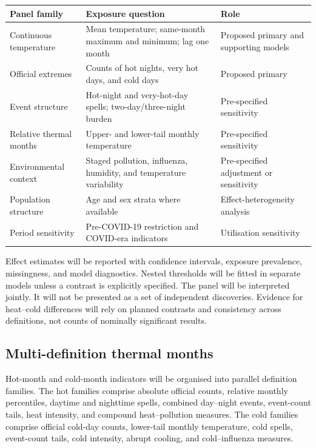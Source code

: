 \documentclass[11pt,a4paper]{article}
\begin{document}
\begin{table}[htbp]
\centering
\small
\begin{tabularx}{\textwidth}{@{}>{\raggedright\arraybackslash}p{}
                                  >{\raggedright\arraybackslash}X
                                  >{\raggedright\arraybackslash}p{}@{}}
\toprule
Panel family & Exposure question & Role \\
\midrule
Continuous temperature & Mean temperature; same-month maximum and minimum; lag one month & Proposed primary and supporting models \\
Official extremes & Counts of hot nights, very hot days, and cold days & Proposed primary \\
Event structure & Hot-night and very-hot-day spells; two-day/three-night burden & Pre-specified sensitivity \\
Relative thermal months & Upper- and lower-tail monthly temperature & Pre-specified sensitivity \\
Environmental context & Staged pollution, influenza, humidity, and temperature variability & Pre-specified adjustment or sensitivity \\
Population structure & Age and sex strata where available & Effect-heterogeneity analysis \\
Period sensitivity & Pre-COVID-19 restriction and COVID-era indicators & Utilisation sensitivity \\
\bottomrule
\end{tabularx}
\end{table}

Effect estimates will be reported with confidence intervals, exposure prevalence, missingness, and model diagnostics. Nested thresholds will be fitted in separate models unless a contrast is explicitly specified. The panel will be interpreted jointly. It will not be presented as a set of independent discoveries. Evidence for heat--cold differences will rely on planned contrasts and consistency across definitions, not counts of nominally significant results.

\subsection{Multi-definition thermal months}

Hot-month and cold-month indicators will be organised into parallel definition families. The hot families comprise absolute official counts, relative monthly percentiles, daytime and nighttime spells, combined day--night events, event-count tails, heat intensity, and compound heat--pollution measures. The cold families comprise official cold-day counts, lower-tail monthly temperature, cold spells, event-count tails, cold intensity, abrupt cooling, and cold--influenza measures.
\end{document}
